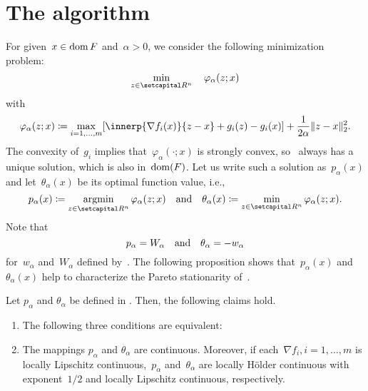 \documentclass[../main]{subfiles}
\begin{document}
\section{The algorithm} 
For given~$x \in \operatorname{dom} F$ and~$\alpha > 0$, we consider the following minimization problem:
\begin{equation} \label{eq:pgm_subproblem}
    \min_{z \in \setR^n} \quad \varphi_\alpha(z; x)
\end{equation}
with
\begin{equation} \label{eq:pgm_obj}
    \varphi_\alpha(z; x) \coloneqq \max_{i = 1, \dots, m} [ \innerp{\nabla f_i(x)}{z - x} + g_i(z) - g_i(x) ] + \frac{1}{2 \alpha} \norm{ z - x }_2^2
    .\end{equation}
The convexity of~$g_i$ implies that~$\varphi_\alpha(\cdot; x)$ is strongly convex, so~ always has a unique solution, which is also in~$\operatorname{dom}(F)$.
Let us write such a solution as~$p_\alpha(x)$ and let~$\theta_\alpha(x)$ be its optimal function value, i.e.,
\begin{equation} \label{eq:pgm_optimal_function}
    p_\alpha(x) \coloneqq \argmin_{z \in \setR^n} \varphi_\alpha(z; x) \eqand \theta_\alpha(x) \coloneqq \min_{z \in \setR^n} \varphi_\alpha(z; x)
    .\end{equation}
Note that
\begin{equation} \label{eq:pgm_merit}
    p_\alpha = W_\alpha \quad \text{and} \quad \theta_\alpha = - w_\alpha
\end{equation}
for~$w_\alpha$ and~$W_\alpha$ defined by~.
The following proposition shows that~$p_\alpha(x)$ and~$\theta_\alpha(x)$ help to characterize the Pareto stationarity of~.
\begin{lemma} 
    Let $p_\alpha$ and $\theta_\alpha$ be defined in .
    Then, the following claims hold.
    \begin{enumerate}
        \item The following three conditions are equivalent:
               
        \item The mappings $p_\alpha$ and $\theta_\alpha$ are continuous.
              Moreover, if each~$\nabla f_i, i = 1, \dots, m$ is locally Lipschitz continuous,~$p_\alpha$ and~$\theta_\alpha$ are locally H\"older continuous with exponent~$1 / 2$ and locally Lipschitz continuous, respectively. 
    \end{enumerate}
\end{lemma}
\end{document}
